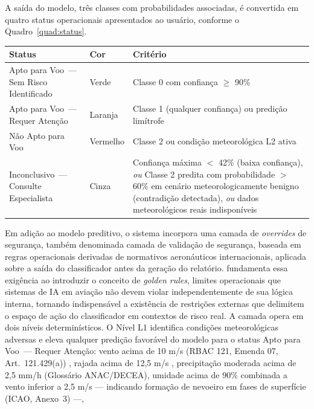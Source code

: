 \documentclass[english,brazilian]{UNISINOSartigo}
\begin{document}
A saída do modelo, três classes com probabilidades associadas, é convertida
em quatro status operacionais apresentados ao usuário, conforme o
Quadro~\ref{quad:status}.
\begin{quadro}[ht]
  \caption{Mapeamento entre classes do modelo e status operacionais}
  \label{quad:status}
  \centering
  \begin{tabular}{llp{7cm}}
    \toprule
    \textbf{Status} & \textbf{Cor} & \textbf{Critério} \\
    \midrule
    Apto para Voo~--- Sem Risco Identificado  & Verde    & Classe 0 com confiança $\geq$ 90\% \\
    Apto para Voo~--- Requer Atenção          & Laranja  & Classe 1 (qualquer confiança) ou predição limítrofe \\
    Não Apto para Voo                         & Vermelho & Classe 2 ou condição meteorológica L2 ativa \\
    Inconclusivo~--- Consulte Especialista    & Cinza    & Confiança máxima $<$ 42\% (baixa confiança), \textit{ou} Classe 2 predita com probabilidade $>$ 60\% em cenário meteorologicamente benigno (contradição detectada), \textit{ou} dados meteorológicos reais indisponíveis \\
    \bottomrule
  \end{tabular}
\end{quadro}
Em adição ao modelo preditivo, o sistema incorpora uma camada de
\textit{overrides} de segurança, também denominada camada de validação de
segurança, baseada em regras operacionais derivadas de normativos aeronáuticos
internacionais, aplicada sobre a saída do classificador antes da geração do relatório.
 fundamenta essa exigência ao introduzir o conceito de
\textit{golden rules}, limites operacionais que sistemas de IA em aviação não devem
violar independentemente de sua lógica interna, tornando indispensável a existência
de restrições externas que delimitem o espaço de ação do classificador em contextos
de risco real.
A camada opera em dois níveis determinísticos. O Nível L1 identifica condições
meteorológicas adversas e eleva qualquer predição favorável do modelo para o status
Apto para Voo~--- Requer Atenção: vento acima de 10 m/s
(RBAC 121, Emenda 07, Art.~121.429(a)) \cite{RBAC121},
rajada acima de 12,5 m/s \cite{ICAO2018},
precipitação moderada acima de 2,5 mm/h (Glossário ANAC/DECEA),
umidade acima de 90\% combinada a vento inferior a 2,5 m/s --- indicando formação de
nevoeiro em fases de superfície (ICAO, Anexo~3) \cite{ICAO2018,WMO2025} ---,
\end{document}
